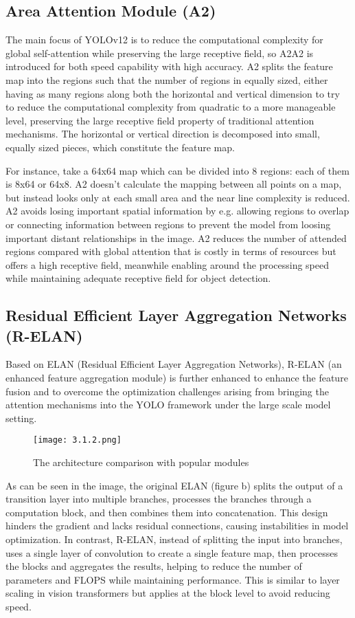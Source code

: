 \documentclass[a4paper,13pt]{report}
\begin{document}
\subsection{Area Attention Module (A2)}
The main focus of YOLOv12 is to reduce the computational complexity for global self-attention while preserving the large receptive field, so A2A2 is introduced for both speed capability with high accuracy. A2 splits the feature map into the regions such that the number of regions in equally sized, either having as many regions along both the horizontal and vertical dimension to try to reduce the computational complexity from quadratic to a more manageable level, preserving the large receptive field property of traditional attention mechanisms. The horizontal or vertical direction is decomposed into small, equally sized pieces, which constitute the feature map.

For instance, take a 64x64 map which can be divided into 8 regions: each of them is 8x64 or 64x8. A2 doesn’t calculate the mapping between all points on a map, but instead looks only at each small area and the near line complexity is reduced. A2 avoids losing important spatial information by e.g. allowing regions to overlap or connecting information between regions to prevent the model from loosing important distant relationships in the image. A2 reduces the number of attended regions compared with global attention that is costly in terms of resources but offers a high receptive field, meanwhile enabling around the processing speed while maintaining adequate receptive field for object detection.

\subsection{Residual Efficient Layer Aggregation Networks (R-ELAN)}
Based on ELAN (Residual Efficient Layer Aggregation Networks), R-ELAN (an enhanced feature aggregation module) is further enhanced to enhance the feature fusion and to overcome the optimization challenges arising from bringing the attention mechanisms into the YOLO framework under the large scale model setting.

\begin{figure}[H]
  \centering
  \texttt{[image: 3.1.2.png]}
  \caption{The architecture comparison with popular modules}
  \label{fig:method}
\end{figure}

As can be seen in the image, the original ELAN (figure b) splits the output of a transition layer into multiple branches, processes the branches through a computation block, and then combines them into concatenation. This design hinders the gradient and lacks residual connections, causing instabilities in model optimization. In contrast, R-ELAN, instead of splitting the input into branches, uses a single layer of convolution to create a single feature map, then processes the blocks and aggregates the results, helping to reduce the number of parameters and FLOPS while maintaining performance. This is similar to layer scaling in vision transformers but applies at the block level to avoid reducing speed.
\end{document}
